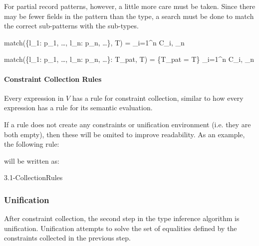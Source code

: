 \documentclass[class=article, crop=false]{standalone}
\begin{document}
\medskip

For partial record patterns, however, a little more care must be taken.
Since there may be fewer fields in the pattern than the type, a search must be done to match the correct sub-patterns with the sub-types.

    {match(\{l_1: p_1, \dots, l_n: p_n, \dots\}, T) = \displaystyle \bigcup_{i=1}^{n} C_i, \Gamma_n}

    {match(\{l_1: p_1, \dots, l_n: p_n, \dots\}: T_{pat}, T) = \{T_{pat} = T\} \cup \displaystyle \bigcup_{i=1}^{n} C_i, \Gamma_n}

\paragraph{Constraint Collection Rules}
Every expression in $V$ has a rule for constraint collection, similar to how every expression has a rule for its semantic evaluation.

If a rule does not create any constraints or unification environment (i.e. they are both empty), then these will be omited to improve readability.
As an example, the following rule:


will be written as:


{3.1-CollectionRules}

\subsubsection{Unification}\label{Unification}

After constraint collection, the second step in the type inference algorithm is unification.
Unification attempts to solve the set of equalities defined by the constraints collected in the previous step.
\end{document}
